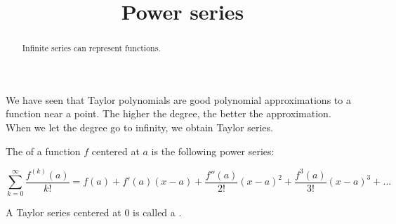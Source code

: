 \documentclass{ximera}
\title[Dig-In:]{Power series}
\begin{document}
\begin{abstract}
  Infinite series can represent functions.
\end{abstract}
\maketitle

We have seen that Taylor polynomials are good polynomial approximations to a function near a point.  The higher the degree, the better the approximation.  When we let the degree go to infinity, we obtain Taylor series.

\begin{definition}
	The  of a function $f$ centered at $a$ is the following power series:
	
	\[
	\sum_{k=0}^\infty \frac{f^{(k)}(a)}{k!} = f(a)+f'(a)(x-a)+\frac{f''(a)}{2!}(x-a)^2+\frac{f^{3}(a)}{3!}(x-a)^3+\dots
	\]
	
	A Taylor series centered at $0$ is called a .
\end{definition}
\end{document}
